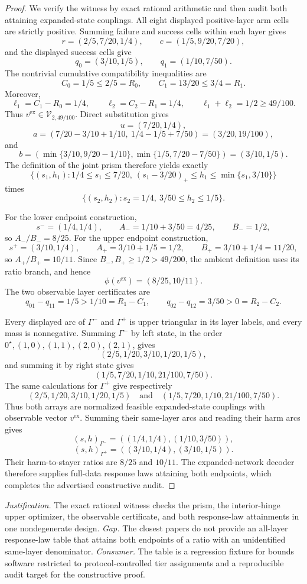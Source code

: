 \documentclass{article}
\begin{document}
\begin{proof}
We verify the witness by exact rational arithmetic and then audit both attaining expanded-state couplings.  All eight displayed positive-layer arm cells are strictly positive.  Summing failure and success cells within each layer gives
\[
 r=(2/5,7/20,1/4),
 \qquad
 c=(1/5,9/20,7/20),
\]
and the displayed success cells give
\[
 q_0=(3/10,1/5),
 \qquad
 q_1=(1/10,7/50).
\]
The nontrivial cumulative compatibility inequalities are
\[
 C_0=1/5\le2/5=R_0,
 \qquad
 C_1=13/20\le3/4=R_1.
\]
Moreover,
\[
 \ell_1=C_1-R_0=1/4,
 \qquad
 \ell_2=C_2-R_1=1/4,
 \qquad
 \ell_1+\ell_2=1/2\ge49/100.
\]
Thus \(v^{\mathrm{ex}}\in\mathcal V_{2,49/100}\).  Direct substitution gives
\[
 u=(7/20,1/4),
\]
\[
 a=\left(7/20-3/10+1/10,\ 1/4-1/5+7/50\right)
 =(3/20,19/100),
\]
and
\[
 b=\left(\min\{3/10,9/20-1/10\},
 \min\{1/5,7/20-7/50\}\right)
 =(3/10,1/5).
\]
The definition of the joint prism therefore yields exactly
\[
 \{(s_1,h_1):1/4\le s_1\le7/20,\ (s_1-3/20)_+\le h_1\le\min\{s_1,3/10\}\}
\]
times
\[
 \{(s_2,h_2):s_2=1/4,\ 3/50\le h_2\le1/5\}.
\]

For the lower endpoint construction,
\[
 s^-=(1/4,1/4),
 \qquad
 A_-=1/10+3/50=4/25,
 \qquad
 B_-=1/2,
\]
so \(A_-/B_-=8/25\).  For the upper endpoint construction,
\[
 s^+=(3/10,1/4),
 \qquad
 A_+=3/10+1/5=1/2,
 \qquad
 B_+=3/10+1/4=11/20,
\]
so \(A_+/B_+=10/11\).  Since \(B_-,B_+\ge1/2>49/200\), the ambient definition uses its ratio branch, and hence
\[
 \phi(v^{\mathrm{ex}})=(8/25,10/11).
\]
The two observable layer certificates are
\[
 q_{01}-q_{11}=1/5>1/10=R_1-C_1,
 \qquad
 q_{02}-q_{12}=3/50>0=R_2-C_2.
\]

Every displayed arc of \(\Gamma^-\) and \(\Gamma^+\) is upper triangular in its layer labels, and every mass is nonnegative.  Summing \(\Gamma^-\) by left state, in the order \(0^{\star},(1,0),(1,1),(2,0),(2,1)\), gives
\[
 (2/5,1/20,3/10,1/20,1/5),
\]
and summing it by right state gives
\[
 (1/5,7/20,1/10,21/100,7/50).
\]
The same calculations for \(\Gamma^+\) give respectively
\[
 (2/5,1/20,3/10,1/20,1/5)
 \quad\text{and}\quad
 (1/5,7/20,1/10,21/100,7/50).
\]
Thus both arrays are normalized feasible expanded-state couplings with observable vector \(v^{\mathrm{ex}}\).  Summing their same-layer arcs and reading their harm arcs gives
\[
 (s,h)_{\Gamma^-}=((1/4,1/4),(1/10,3/50)),
\]
\[
 (s,h)_{\Gamma^+}=((3/10,1/4),(3/10,1/5)).
\]
Their harm-to-stayer ratios are \(8/25\) and \(10/11\).  The expanded-network decoder therefore supplies full-data response laws attaining both endpoints, which completes the advertised constructive audit.
\end{proof}
\par\smallskip\noindent \textit{Justification.} The exact rational witness checks the prism, the interior-hinge upper optimizer, the observable certificate, and both response-law attainments in one nondegenerate design. \textit{Gap.} The closest papers do not provide an all-layer response-law table that attains both endpoints of a ratio with an unidentified same-layer denominator. \textit{Consumer.} The table is a regression fixture for bounds software restricted to protocol-controlled tier assignments and a reproducible audit target for the constructive proof.
\end{document}
